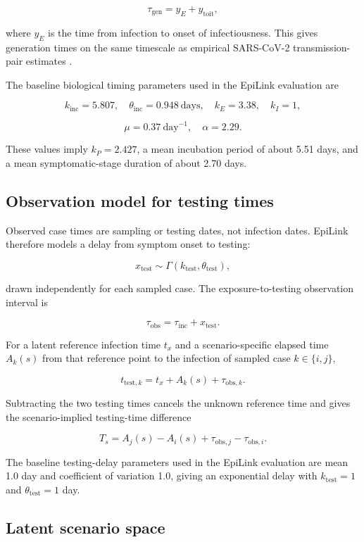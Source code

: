 \[
	\tau_{\mathrm{gen}} = y_E + y_{\mathrm{toit}},
\]

where $y_E$ is the time from infection to onset of infectiousness. This gives generation times on the same timescale as empirical SARS-CoV-2 transmission-pair estimates \citep{Ganyani2020,Hart2022}.

The baseline biological timing parameters used in the EpiLink evaluation are

\[
	k_{\mathrm{inc}} = 5.807,\quad
	\theta_{\mathrm{inc}} = 0.948\ \mathrm{days},\quad
	k_E = 3.38,\quad
	k_I = 1,
\]

\[
	\mu = 0.37\ \mathrm{day}^{-1},\quad
	\alpha = 2.29.
\]

These values imply $k_P = 2.427$, a mean incubation period of about 5.51 days, and a mean symptomatic-stage duration of about 2.70 days.

\subsection{Observation model for testing times}\label{sec:app_ch3_testing_time_model}

Observed case times are sampling or testing dates, not infection dates. EpiLink therefore models a delay from symptom onset to testing:

\[
	x_{\mathrm{test}} \sim
	\Gamma(k_{\mathrm{test}}, \theta_{\mathrm{test}}),
\]

drawn independently for each sampled case. The exposure-to-testing observation interval is

\[
	\tau_{\mathrm{obs}} = \tau_{\mathrm{inc}} + x_{\mathrm{test}}.
\]

For a latent reference infection time $t_x$ and a scenario-specific elapsed time $A_k(s)$ from that reference point to the infection of sampled case $k \in \{i,j\}$,

\[
	t_{\mathrm{test},k} = t_x + A_k(s) + \tau_{\mathrm{obs},k}.
\]

Subtracting the two testing times cancels the unknown reference time and gives the scenario-implied testing-time difference

\[
	T_s = A_j(s) - A_i(s)
	+ \tau_{\mathrm{obs},j} - \tau_{\mathrm{obs},i}.
\]

The baseline testing-delay parameters used in the EpiLink evaluation are mean 1.0 day and coefficient of variation 1.0, giving an exponential delay with $k_{\mathrm{test}} = 1$ and $\theta_{\mathrm{test}} = 1$ day.

\subsection{Latent scenario space}\label{sec:app_ch3_latent_scenario_space}

